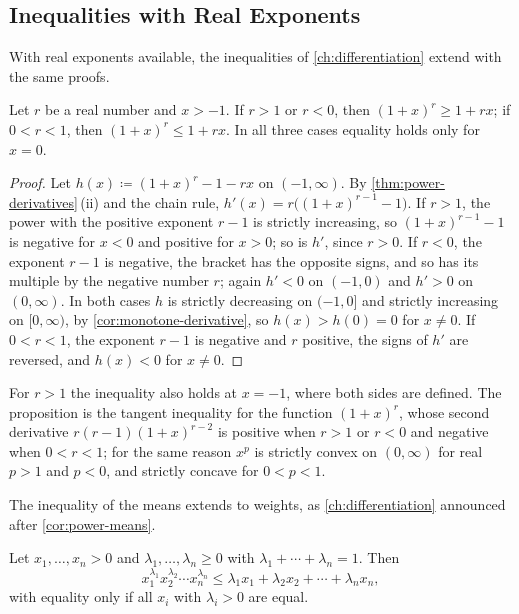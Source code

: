 \subsection{Inequalities with Real Exponents}

With real exponents available, the inequalities of \cref{ch:differentiation} extend with the same proofs.

\begin{proposition}
\label{prop:bernoulli-real}
Let $r$ be a real number and $x>-1$. If $r>1$ or $r<0$, then $(1+x)^r\ge1+rx$; if $0<r<1$, then $(1+x)^r\le1+rx$. In all three cases equality holds only for $x=0$.
\end{proposition}

\begin{proof}
Let $h(x)\coloneqq(1+x)^r-1-rx$ on $(-1,\infty)$. By \cref{thm:power-derivatives}\,(ii) and the chain rule, $h'(x)=r\bigl((1+x)^{r-1}-1\bigr)$. If $r>1$, the power with the positive exponent $r-1$ is strictly increasing, so $(1+x)^{r-1}-1$ is negative for $x<0$ and positive for $x>0$; so is $h'$, since $r>0$. If $r<0$, the exponent $r-1$ is negative, the bracket has the opposite signs, and so has its multiple by the negative number $r$; again $h'<0$ on $(-1,0)$ and $h'>0$ on $(0,\infty)$. In both cases $h$ is strictly decreasing on $(-1,0]$ and strictly increasing on $[0,\infty)$, by \cref{cor:monotone-derivative}, so $h(x)>h(0)=0$ for $x\ne0$. If $0<r<1$, the exponent $r-1$ is negative and $r$ positive, the signs of $h'$ are reversed, and $h(x)<0$ for $x\ne0$.
\end{proof}

For $r>1$ the inequality also holds at $x=-1$, where both sides are defined. The proposition is the tangent inequality for the function $(1+x)^r$, whose second derivative $r(r-1)(1+x)^{r-2}$ is positive when $r>1$ or $r<0$ and negative when $0<r<1$; for the same reason $x^p$ is strictly convex on $(0,\infty)$ for real $p>1$ and $p<0$, and strictly concave for $0<p<1$.

The inequality of the means extends to weights, as \cref{ch:differentiation} announced after \cref{cor:power-means}.

\begin{theorem}
\label{thm:weighted-amgm}
Let $x_1,\ldots,x_n>0$ and $\lambda_1,\ldots,\lambda_n\ge0$ with $\lambda_1+\cdots+\lambda_n=1$. Then
\[
x_1^{\lambda_1}x_2^{\lambda_2}\cdots x_n^{\lambda_n}\le\lambda_1x_1+\lambda_2x_2+\cdots+\lambda_nx_n ,
\]
with equality only if all $x_i$ with $\lambda_i>0$ are equal.
\end{theorem}

